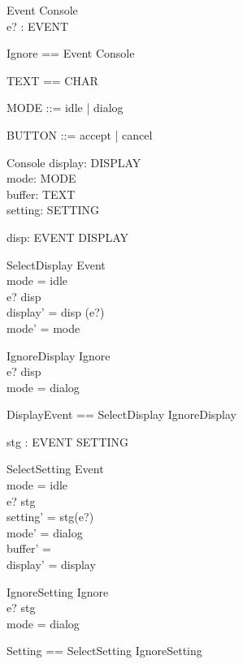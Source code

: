 \documentclass{llncs}
\begin{document}
\begin{zed}
[EVENT]
\end{zed}
\begin{schema}{Event}
\Delta Console\\
e? : EVENT
\end{schema}
\begin{zed}
Ignore == Event \land \Xi Console
\end{zed}

\begin{zed}
\end{zed}
\begin{zed}
TEXT == \seq CHAR
\end{zed}
\begin{zed}
MODE ::= idle | dialog
\end{zed}
\begin{zed}
BUTTON ::= accept | cancel
\end{zed}
\begin{schema}{Console}
display: DISPLAY \\
mode: MODE \\
buffer: TEXT \\
setting: SETTING
\end{schema}

\begin{axdef}
disp: EVENT \pfun DISPLAY
\end{axdef}
\begin{schema}{SelectDisplay}
Event \\
\where mode = idle \\
e? \in \dom disp \\
display' = disp (e?) \\
mode' = mode
\end{schema}
\begin{schema}{IgnoreDisplay}
Ignore \\
\where e? \in \dom disp\\
mode = dialog
\end{schema}
\begin{zed}
DisplayEvent == SelectDisplay \lor IgnoreDisplay
\end{zed}

\begin{axdef}
stg : EVENT \pfun SETTING
\end{axdef}
\begin{schema}{SelectSetting}
Event \\
\where mode = idle \\
e? \in \dom stg \\
setting' = stg(e?) \\
mode' = dialog \\
buffer' = \emptyset \\
display' = display
\end{schema}
\begin{schema}{IgnoreSetting}
Ignore \\
\where e? \in \dom stg \\
mode = dialog
\end{schema}
\begin{zed}
Setting == SelectSetting \lor IgnoreSetting
\end{zed}
\end{document}
